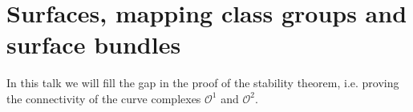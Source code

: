 \section{Surfaces, mapping class groups and surface bundles}
In this talk we will fill the gap in the proof of the stability theorem, i.e. proving the connectivity of the curve complexes $\mathcal{O}^1$ and $\mathcal{O}^2$.